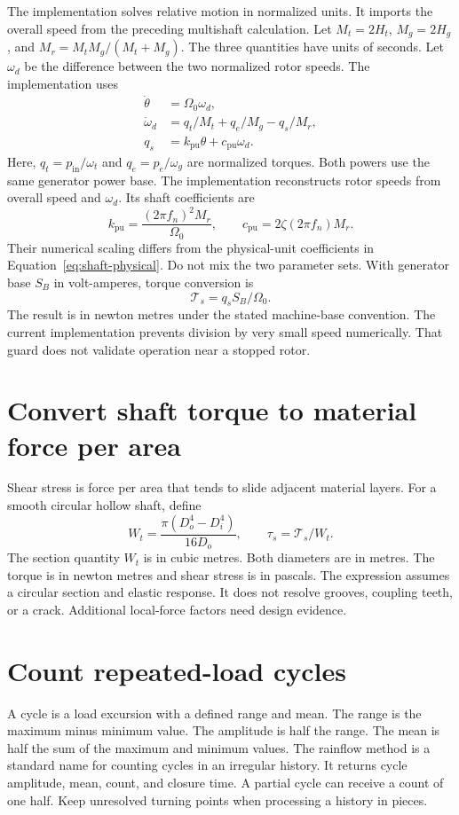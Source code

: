 \documentclass[11pt,a4paper]{report}
\begin{document}
The implementation solves relative motion in normalized units.
It imports the overall speed from the preceding multishaft calculation.
Let $M_t=2H_t$, $M_g=2H_g$, and $M_r=M_tM_g/(M_t+M_g)$.
The three quantities have units of seconds.
Let $\omega_d$ be the difference between the two normalized rotor speeds.
The implementation uses
\begin{align}
\dot\theta&=\Omega_0\omega_d,\\
\dot\omega_d&=q_t/M_t+q_e/M_g-q_s/M_r,\\
q_s&=k_{\mathrm{pu}}\theta+c_{\mathrm{pu}}\omega_d.
\end{align}
Here, $q_t=p_{\mathrm{in}}/\omega_t$ and $q_e=p_e/\omega_g$ are normalized torques.
Both powers use the same generator power base.
The implementation reconstructs rotor speeds from overall speed and $\omega_d$.
Its shaft coefficients are
\begin{equation}
k_{\mathrm{pu}}=\frac{(2\pi f_n)^2M_r}{\Omega_0},\qquad
c_{\mathrm{pu}}=2\zeta(2\pi f_n)M_r.
\end{equation}
Their numerical scaling differs from the physical-unit coefficients in Equation~\ref{eq:shaft-physical}.
Do not mix the two parameter sets.
With generator base $S_B$ in volt-amperes, torque conversion is
\begin{equation}
\mathcal{T}_s=q_sS_B/\Omega_0.
\end{equation}
The result is in newton metres under the stated machine-base convention.
The current implementation prevents division by very small speed numerically.
That guard does not validate operation near a stopped rotor.

\section{Convert shaft torque to material force per area}
Shear stress is force per area that tends to slide adjacent material layers.
For a smooth circular hollow shaft, define
\begin{equation}
W_t=\frac{\pi(D_o^4-D_i^4)}{16D_o},\qquad
\tau_s=\mathcal{T}_s/W_t.
\end{equation}
The section quantity $W_t$ is in cubic metres.
Both diameters are in metres.
The torque is in newton metres and shear stress is in pascals.
The expression assumes a circular section and elastic response.
It does not resolve grooves, coupling teeth, or a crack.
Additional local-force factors need design evidence.

\section{Count repeated-load cycles}
A cycle is a load excursion with a defined range and mean.
The range is the maximum minus minimum value.
The amplitude is half the range.
The mean is half the sum of the maximum and minimum values.
The rainflow method is a standard name for counting cycles in an irregular history.
It returns cycle amplitude, mean, count, and closure time.
A partial cycle can receive a count of one half.
Keep unresolved turning points when processing a history in pieces.
\end{document}
